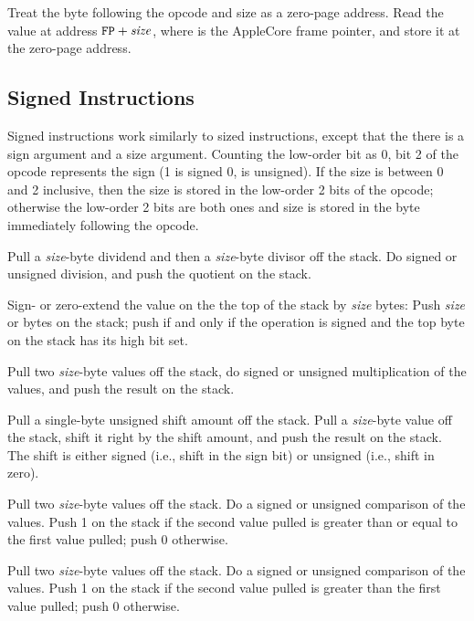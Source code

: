 \documentclass[10pt]{article}
\begin{document}
Treat the byte following the opcode and size as a zero-page
address.  Read the value at address $\texttt{FP}+\mbox{\textit{size}}$, 
where  is the AppleCore frame pointer, and store
it at the zero-page address.

\subsection{Signed Instructions}

Signed instructions work similarly to sized instructions, except that
the there is a sign argument and a size argument.  Counting the
low-order bit as 0, bit 2 of the opcode represents the sign (1 is
signed 0, is unsigned).  If the size is between 0 and 2 inclusive,
then the size is stored in the low-order 2 bits of the opcode;
otherwise the low-order 2 bits are both ones and size is stored in the
byte immediately following the opcode.

 Pull a \emph{size}-byte
dividend and then a \emph{size}-byte divisor off the stack.  Do signed
or unsigned division, and push the quotient on the stack.

 Sign- or zero-extend the
value on the the top of the stack by \emph{size} bytes: Push
\emph{size}  or  bytes on the stack; push
 if and only if the operation is signed and the top byte on
the stack has its high bit set.

 Pull two \emph{size}-byte
values off the stack, do signed or unsigned multiplication of the
values, and push the result on the stack.

 Pull a single-byte
unsigned shift amount off the stack.  Pull a \emph{size}-byte value
off the stack, shift it right by the shift amount, and push the result
on the stack.  The shift is either signed (i.e., shift in the sign
bit) or unsigned (i.e., shift in zero).

 Pull two
\emph{size}-byte values off the stack. Do a signed or unsigned
comparison of the values.  Push 1 on the stack if the second value
pulled is greater than or equal to the first value pulled; push 0
otherwise.

 Pull two
\emph{size}-byte values off the stack. Do a signed or unsigned
comparison of the values.  Push 1 on the stack if the second value
pulled is greater than the first value pulled; push 0 otherwise.
\end{document}
